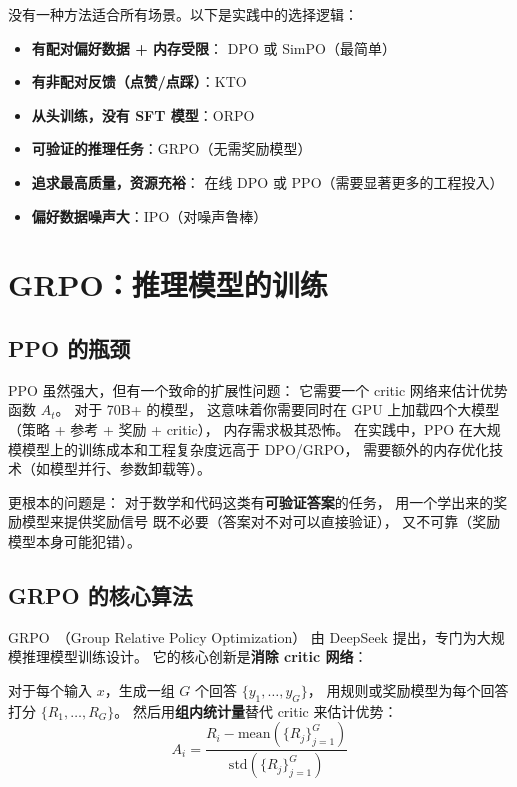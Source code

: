 \begin{keybox}[偏好优化的方法选择指南]
没有一种方法适合所有场景。以下是实践中的选择逻辑：
\begin{itemize}[noitemsep]
  \item \textbf{有配对偏好数据 + 内存受限}：
        DPO 或 SimPO（最简单）
  \item \textbf{有非配对反馈（点赞/点踩）}：KTO
  \item \textbf{从头训练，没有 SFT 模型}：ORPO
  \item \textbf{可验证的推理任务}：GRPO（无需奖励模型）
  \item \textbf{追求最高质量，资源充裕}：
        在线 DPO 或 PPO（需要显著更多的工程投入）
  \item \textbf{偏好数据噪声大}：IPO（对噪声鲁棒）
\end{itemize}
\end{keybox}

\section{GRPO：推理模型的训练}

\subsection{PPO 的瓶颈}

PPO 虽然强大，但有一个致命的扩展性问题：
它需要一个 critic 网络来估计优势函数 $A_t$。
对于 70B+ 的模型，
这意味着你需要同时在 GPU 上加载四个大模型
（策略 + 参考 + 奖励 + critic），
内存需求极其恐怖。
在实践中，PPO 在大规模模型上的训练成本和工程复杂度远高于 DPO/GRPO，
需要额外的内存优化技术（如模型并行、参数卸载等）。

更根本的问题是：
对于数学和代码这类有\textbf{可验证答案}的任务，
用一个学出来的奖励模型来提供奖励信号
既不必要（答案对不对可以直接验证），
又不可靠（奖励模型本身可能犯错）。

\subsection{GRPO 的核心算法}

GRPO~\cite{shao2024grpo}（Group Relative Policy Optimization）
由 DeepSeek 提出，专门为大规模推理模型训练设计。
它的核心创新是\textbf{消除 critic 网络}：

对于每个输入 $x$，生成一组 $G$ 个回答
$\{y_1, \ldots, y_G\}$，
用规则或奖励模型为每个回答打分 $\{R_1, \ldots, R_G\}$。
然后用\textbf{组内统计量}替代 critic 来估计优势：
\begin{equation}
  A_i = \frac{R_i - \mathrm{mean}(\{R_j\}_{j=1}^G)}
             {\mathrm{std}(\{R_j\}_{j=1}^G)}
  \label{eq:grpo-adv}
\end{equation}


